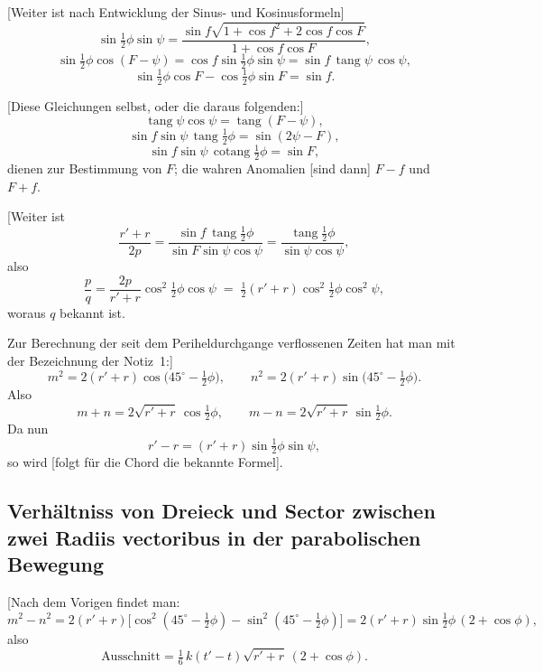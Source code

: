 \documentclass[11pt,a4paper]{article}
\newcommand{\tang}{\operatorname{tang}}
\newcommand{\cotang}{\operatorname{cotang}}
\begin{document}
\medskip

[Weiter ist nach Entwicklung der Sinus- und Kosinusformeln]
\[
  \sin\!\tfrac{1}{2}\phi \sin\psi
   = \frac{\sin f\sqrt{1 + \cos f^{2} + 2\cos f\cos F}}
          {\,1 + \cos f\cos F\,},
\]
\[
  \sin\!\tfrac{1}{2}\phi \cos(F-\psi) = \cos f \sin\!\tfrac{1}{2}\phi \sin\psi
                                   = \sin f\,\tang\psi\,\cos\psi,
\]
\[
  \sin\!\tfrac{1}{2}\phi \cos F - \cos\!\tfrac{1}{2}\phi \sin F = \sin f.
\]

\medskip

[Diese Gleichungen selbst, oder die daraus folgenden:]
\[
  \tang\psi \cos\psi = \tang(F-\psi),
\]
\[
  \sin f\sin\psi\,\tang\!\tfrac{1}{2}\phi = \sin(2\psi - F),
\]
\[
  \sin f\sin\psi\,\cotang\!\tfrac{1}{2}\phi = \sin F,
\]
dienen zur Bestimmung von $F$; die wahren Anomalien [sind dann]
$F - f$ und $F + f$.

\bigskip

[Weiter ist
\[
  \frac{r' + r}{2p}
   = \frac{\sin f \,\tang\!\tfrac{1}{2}\phi}{\sin F\sin\psi\cos\psi}
   = \frac{\tang\!\tfrac{1}{2}\phi}{\sin\psi\cos\psi},
\]
also
\[
  \frac{p}{q} = \frac{2p}{r' + r} \cos^{2}\!\tfrac{1}{2}\phi \cos\psi
              \;=\; \tfrac{1}{2}(r' + r)\cos^{2}\!\tfrac{1}{2}\phi \cos^{2}\psi,
\]
woraus $q$ bekannt ist.

\bigskip

Zur Berechnung der seit dem Periheldurchgange verflossenen Zeiten hat
man mit der Bezeichnung der Notiz~1:]
\[
  m^{2} = 2(r' + r)\cos\!\bigl(45^{\circ} - \tfrac{1}{2}\phi\bigr),
  \qquad
  n^{2} = 2(r' + r)\sin\!\bigl(45^{\circ} - \tfrac{1}{2}\phi\bigr).
\]
Also
\[
  m + n = 2\sqrt{r' + r}\,\cos\!\tfrac{1}{2}\phi,
  \qquad
  m - n = 2\sqrt{r' + r}\,\sin\!\tfrac{1}{2}\phi.
\]
Da nun
\[
  r' - r = (r' + r)\sin\!\tfrac{1}{2}\phi\sin\psi,
\]
so wird [folgt für die Chord die bekannte Formel].

\bigskip

\subsection*{Verh\"altniss von Dreieck und Sector zwischen zwei
Radiis vectoribus in der parabolischen Bewegung}

\medskip

[Nach dem Vorigen findet man:
\[
  m^{2} - n^{2}
   = 2(r' + r)\bigl[\cos^{2}(45^{\circ} - \tfrac{1}{2}\phi)
                  - \sin^{2}(45^{\circ} - \tfrac{1}{2}\phi)\bigr]
   = 2(r' + r)\sin\!\tfrac{1}{2}\phi\,(2 + \cos\phi),
\]
also
\[
  \text{Ausschnitt}
   = \tfrac{1}{6}\,k(t' - t)\sqrt{r' + r}\,(2 + \cos\phi).
\]
\end{document}
